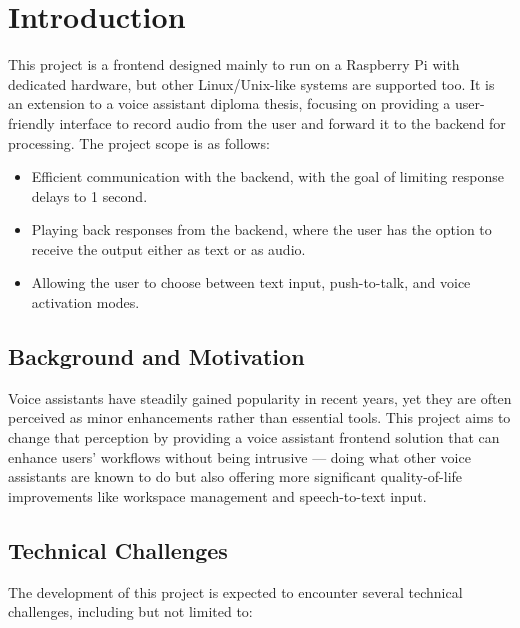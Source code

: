 \renewcommand*\chapterpagestyle{scrheadings}
\chapter{Introduction}
This project is a frontend designed mainly to run on a Raspberry Pi with dedicated hardware,
but other Linux/Unix-like systems are supported too.
It is an extension to a voice assistant diploma thesis, focusing on providing a user-friendly
interface to record audio from the user and forward it to the backend for processing.
The project scope is as follows:
\begin{itemize}
    \item Efficient communication with the backend, with the goal of limiting response delays to 1 second.
    \item Playing back responses from the backend, where the user has the option to receive the output either as text or as audio.
    \item Allowing the user to choose between text input, push-to-talk, and voice activation modes.
\end{itemize}

\section{Background and Motivation}
Voice assistants have steadily gained popularity in recent years, yet they are often perceived
as minor enhancements rather than essential tools. This project aims to change that perception
by providing a voice assistant frontend solution that can enhance users' workflows without being
intrusive --- doing what other voice assistants are known to do but also offering more significant
quality-of-life improvements like workspace management and speech-to-text input.

\section{Technical Challenges}
The development of this project is expected to encounter several technical challenges,
including but not limited to:

